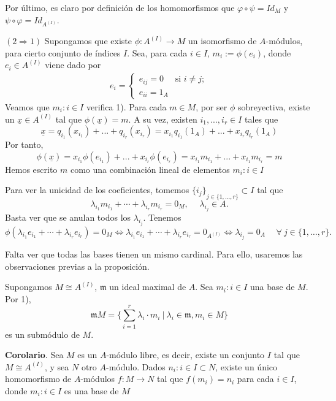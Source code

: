 \documentclass[a4paper,12pt]{article}
\begin{document}
Por último, es claro por definición de los homomorfismos que $\varphi\circ\psi=Id_{M}$ y $\psi\circ\varphi=Id_{A^{(I)}}$.

$(2\Rightarrow 1)$ Supongamos que existe $\phi: A^{(I)}\rightarrow M$ un isomorfismo de $A$-módulos, para cierto conjunto de índices $I$. Sea, para cada $i\in I$, $m_i:=\phi(e_i)$, donde $e_i\in A^{(I)}$ viene dado por
$$\begin{array}{rccl}
    e_i= \left\{ \begin{array}{ll}
         e_{ij}=0 & \mbox{si $i\neq j$};\\
         e_{ii}=1_A & \mbox{}\end{array} \right.
\end{array}$$
Veamos que ${m_i:i\in I}$ verifica 1). Para cada $m\in M$, por ser $\phi$ sobreyectiva, existe un $\underline{x}\in A^{(I)}$ tal que $\phi(\underline{x})=m$. A su vez, existen $i_1,...,i_r\in I$ tales que
$$\underline{x}=q_{i_1}(x_{i_1})+...+q_{i_r}(x_{i_r})=x_{i_1}q_{i_1}(1_A)+...+x_{i_r}q_{i_r}(1_A)$$
Por tanto,
$$\phi(\underline{x})=x_{i_1}\phi(e_{i_1})+...+x_{i_r}\phi(e_{i_r})=x_{i_1}m_{i_1}+...+x_{i_1}m_{i_r}=m$$
Hemos escrito $m$ como una combinación lineal de elementos ${m_i:i\in I}$

Para ver la unicidad de los coeficientes, tomemos ${\{i_j\}}_{j\in\{1,\dots,r\}}\subset I$ tal que$$\lambda_{i_1}m_{i_1}+\cdots+\lambda_{i_r}m_{i_r}=0_M,\hspace{15pt}\lambda_{i_j}\in A.$$
Basta ver que se anulan todos los $\lambda_{i_j}$. Tenemos
$$\phi(\lambda_{i_1}e_{i_1}+\cdots+\lambda_{i_r}e_{i_r})=0_M\Longleftrightarrow\lambda_{i_1}e_{i_1}+\cdots+\lambda_{i_r}e_{i_r}=0_{A^{(I)}}\Longleftrightarrow\lambda_{i_j}=0_A\hspace{15pt}\forall\ j\in\{1,\dots,r\}.$$

Falta ver que todas las bases tienen un mismo cardinal. Para ello, usaremos las observaciones previas a la proposición.

Supongamos $M\cong A^{(I)}$, $\mathfrak{m}$ un ideal maximal de $A$. Sea ${m_i:i\in I}$ una base de $M$. Por 1), $$\mathfrak{m}M=\{\sum_{i=1}^r \lambda_i\cdot m_i\ |\  \lambda_i\in \mathfrak{m}, m_i\in M\}$$
es un submódulo de $M$.

\textbf{Corolario}. Sea $M$ es un $A$-módulo libre, es decir, existe un conjunto $I$ tal que $M\cong A^{(I)}$, y sea $N$ otro $A$-módulo. Dados ${n_i:i\in I}\subset N$, existe un único homomorfismo de $A$-módulos $f:M\rightarrow N$ tal que $f(m_i)=n_i$ para cada $i\in I$, donde ${m_i: i\in I}$ es una base de $M$
\end{document}
